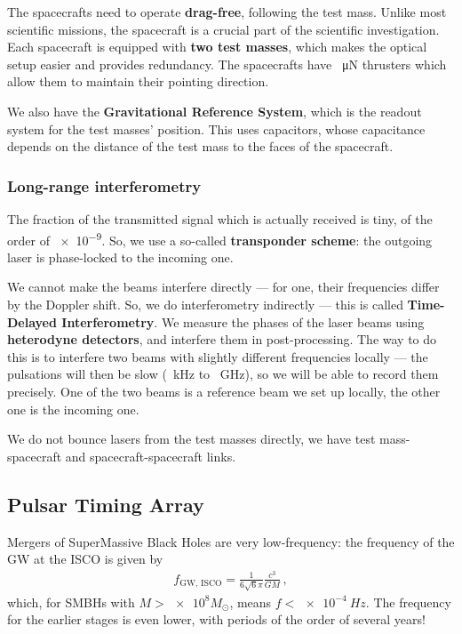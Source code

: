 \documentclass[main.tex]{subfiles}
\begin{document}
The spacecrafts need to operate \textbf{drag-free}, following the test mass. Unlike most scientific missions, the spacecraft is a crucial part of the scientific investigation. 
Each spacecraft is equipped with \textbf{two test masses}, which makes the optical setup easier and provides redundancy. 
The spacecrafts have \SI{}{\micro N} thrusters which allow them to maintain their pointing direction. 

We also have the \textbf{Gravitational Reference System}, which is the readout system for the test masses' position.
This uses capacitors, whose capacitance depends on the distance of the test mass to the faces of the spacecraft. 

\subsubsection{Long-range interferometry}

The fraction of the transmitted signal which is actually received is tiny, of the order of \num{e-9}. 
So, we use a so-called \textbf{transponder scheme}: the outgoing laser is phase-locked to the incoming one. 

We cannot make the beams interfere directly --- for one, their frequencies differ by the Doppler shift. 
So, we do interferometry indirectly --- this is called \textbf{Time-Delayed Interferometry}. 
We measure the phases of the laser beams using \textbf{heterodyne detectors}, and interfere them in post-processing.
The way to do this is to interfere two beams with slightly different frequencies locally --- the pulsations will then be slow (\SI{}{kHz} to \SI{}{GHz}), so we will be able to record them precisely. 
One of the two beams is a reference beam we set up locally, the other one is the incoming one. 

We do not bounce lasers from the test masses directly, we have test mass-spacecraft and spacecraft-spacecraft links.

\subsection{Pulsar Timing Array}

Mergers of SuperMassive Black Holes are very low-frequency: the frequency of the GW at the ISCO is given by 
%
\begin{align}
f _{\text{GW, ISCO}} = \frac{1}{6 \sqrt{6} \pi } \frac{c^3}{GM}
\,,
\end{align}
%
which, for SMBHs with \(M > \num{e8} M_{\odot}\), means \(f < \SI{e-4}{Hz}\). 
The frequency for the earlier stages is even lower, with periods of the order of several years! 
\end{document}
